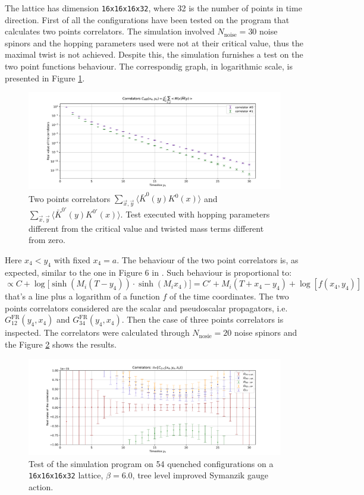 \documentclass[english, LaM, oneside, noexaminfo]{sapthesis}
\newcommand{\la}{\langle}
\newcommand{\ra}{\rangle}
\begin{document}
The lattice has dimension \texttt{16x16x16x32}, where 32 is the number of points in time direction.
First of all the configurations have been tested on the program that calculates two points correlators.
The simulation involved $N_\text{noise} = 30$ noise spinors and the hopping parameters used were not at their critical value, thus the maximal twist is not achieved.
Despite this, the simulation furnishes a test on the two point functions behaviour.
The correspondig graph, in logarithmic scale, is presented in Figure \ref{fig:plot-2pts}.
\begin{figure}[!h]
    \centering
    \includegraphics[width=\textwidth]{imgs-MSc-thesis/pureYM-2pts.pdf}
    \caption{Two points correlators $\sum_{\vec x, \vec y} \la \bar K^0 (y) K^0 (x) \ra$ and $\sum_{\vec x, \vec y} \la \bar K^{0'} (y) K^{0'} (x) \ra$.
        Test executed with hopping parameters different from the critical value and twisted mass terms different from zero.}
    \label{fig:plot-2pts}
\end{figure}
Here $x_4<y_4$ with fixed $x_4=a$.
The behaviour of the two point correlators is, as expected, similar to the one in Figure 6 in \cite{OBC-tm}.
Such behaviour is proportional to:
\begin{equation*}
    \propto C + \log\big[\sinh \left(M_i (T-y_4)\right)\cdot \sinh \left(M_i x_4\right)\big] = C' + M_i \left(T+x_4-y_4\right) + \log \left[f(x_4,y_4)\right]
\end{equation*}
that's a line plus a logarithm of a function $f$ of the time coordinates.
The two points correlators considered are the scalar and pseudoscalar propagators, i.e. $G_{12}^\text{FR}(y_4,x_4)$ and $G_{34}^\text{FR}(y_4,x_4)$.
\newline
Then the case of three points correlators is inspected.
The correlators were calculated through $N_\text{nosie} = 20$ noise spinors and the Figure \ref{fig:pureYM} shows the results.
\begin{figure}[!h]
    \centering
    \includegraphics[width=\textwidth]{imgs-MSc-thesis/pureYM-3pts.pdf}
    \caption{Test of the simulation program on 54 quenched configurations on a \texttt{16x16x16x32} lattice, $\beta = 6.0$, tree level improved Symanzik gauge action.}
    \label{fig:pureYM}
\end{figure}
\end{document}
